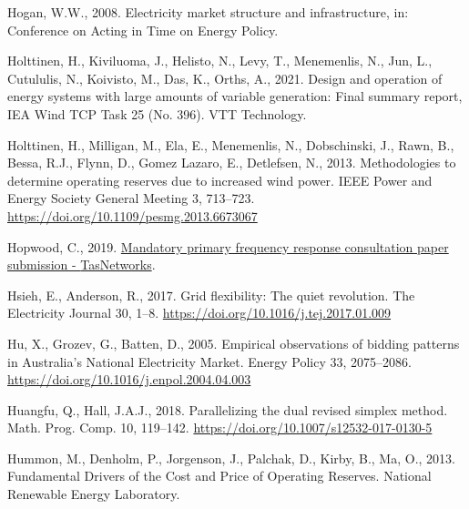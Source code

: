 \documentclass[12pt,a4paper,]{report}
\newlength{\cslhangindent}
\newenvironment{CSLReferences}[2] %
 {%
  \setlength{\parindent}{0pt}
  \ifodd #1 \everypar{\setlength{\hangindent}{\cslhangindent}}\ignorespaces\fi
  \ifnum #2 > 0
  \setlength{\parskip}{#2\baselineskip}
  \fi
 }%
 {}
\begin{document}
\begin{CSLReferences}{1}{0}
\leavevmode{}%
Hogan, W.W., 2008. Electricity market structure and infrastructure, in:
Conference on {Acting} in {Time} on {Energy Policy}.

\leavevmode{}%
Holttinen, H., Kiviluoma, J., Helisto, N., Levy, T., Menemenlis, N.,
Jun, L., Cutululis, N., Koivisto, M., Das, K., Orths, A., 2021. Design
and operation of energy systems with large amounts of variable
generation: {Final} summary report, {IEA Wind TCP Task} 25 (No. 396).
{VTT Technology}.

\leavevmode{}%
Holttinen, H., Milligan, M., Ela, E., Menemenlis, N., Dobschinski, J.,
Rawn, B., Bessa, R.J., Flynn, D., Gomez Lazaro, E., Detlefsen, N., 2013.
Methodologies to determine operating reserves due to increased wind
power. IEEE Power and Energy Society General Meeting 3, 713--723.
\url{https://doi.org/10.1109/pesmg.2013.6673067}

\leavevmode{}%
Hopwood, C., 2019.
\href{https://www.aemc.gov.au/sites/default/files/2019-11/Rule\%20Change\%20SubmissionERC0274\%20-\%20TasNetworks\%20-\%2020191031.PDF}{Mandatory
primary frequency response consultation paper submission -
{TasNetworks}}.

\leavevmode{}%
Hsieh, E., Anderson, R., 2017. Grid flexibility: {The} quiet revolution.
The Electricity Journal 30, 1--8.
\url{https://doi.org/10.1016/j.tej.2017.01.009}

\leavevmode{}%
Hu, X., Grozev, G., Batten, D., 2005. Empirical observations of bidding
patterns in {Australia}'s {National Electricity Market}. Energy Policy
33, 2075--2086. \url{https://doi.org/10.1016/j.enpol.2004.04.003}

\leavevmode{}%
Huangfu, Q., Hall, J.A.J., 2018. Parallelizing the dual revised simplex
method. Math. Prog. Comp. 10, 119--142.
\url{https://doi.org/10.1007/s12532-017-0130-5}

\leavevmode{}%
Hummon, M., Denholm, P., Jorgenson, J., Palchak, D., Kirby, B., Ma, O.,
2013. Fundamental {Drivers} of the {Cost} and {Price} of {Operating
Reserves}. {National Renewable Energy Laboratory}.


\end{CSLReferences}
\end{document}
